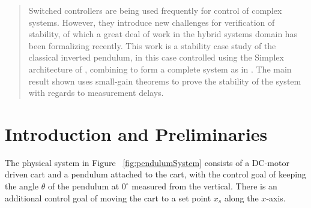 \documentclass[conference]{IEEEtran}
\begin{document}




\maketitle


\begin{abstract}
Switched controllers are being used frequently for control of complex systems.  However, they introduce new challenges for verification of stability, of which a great deal of work in the hybrid systems domain has been formalizing recently.  This work is a stability case study of the classical inverted pendulum, in this case controlled using the Simplex architecture of \cite{ShaACC1998}, combining to form a complete system as in \cite{SetoSha1999}.  The main result shown uses small-gain theorems to prove the stability of the system with regards to measurement delays.
\end{abstract}





%
\IEEEpeerreviewmaketitle



\section{Introduction and Preliminaries}

The physical system in Figure ~\ref{fig:pendulumSystem} consists of a DC-motor driven cart and a pendulum attached to the cart, with the control goal of keeping the angle $\theta$ of the pendulum at $0^{\circ}$ measured from the vertical.  There is an additional control goal of moving the cart to a set point $x_s$ along the $x$-axis.
\end{document}
